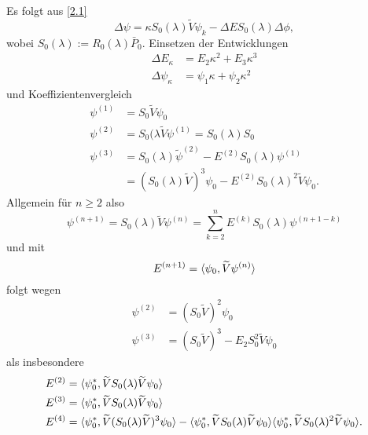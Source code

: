 \documentclass{mycourse}
\begin{document}
\begin{seg}
Es folgt aus \eqref{2.1}
\[
\Delta \psi = \kappa S_0(\lambda) \tilde V \psi_k - \Delta E S_0(\lambda) \Delta \phi,
\]
wobei $S_0(\lambda):=R_0(\lambda) \bar P_0$. Einsetzen der Entwicklungen 
\begin{align*}
\Delta E_\kappa &= E_2 \kappa^2 + E_3 \kappa^3 \\
\Delta \psi_\kappa &= \psi_1 \kappa + \psi_2 \kappa^2
\end{align*}
und Koeffizientenvergleich
\begin{align*}
\psi^{(1)} &= S_0 \tilde V \psi_0\\
\psi^{(2)} &= S_0(\lambda \tilde V \psi^(1) =S_0(\lambda) S_0 \\
\psi^{(3)} &= S_0(\lambda) \tilde \psi^{(2)} - E^{(2)} S_0(\lambda) \psi^{(1)}\\
&=  (S_0(\lambda) \tilde V)^3 \psi_0 - E^{(2)} S_0(\lambda)^2 \tilde V \psi_0.
\end{align*}
Allgemein für $n\ge 2$ also
\[
\psi^{(n+1)}= S_0(\lambda) \tilde V \psi^{(n)} = \sum_{k=2}^n E^{(k)} S_0(\lambda) \psi^{(n+1-k)}
\]
und mit 
\[
E^{(n+1)}= \langle \psi_0, \widetilde V \psi^{(n)}\rangle
\] 
folgt wegen
\begin{align*}
\psi^{(2)} &= (S_0 \tilde V)^2 \psi_0\\
\psi^{(3)} &= (S_0 \tilde V)^3 - E_2 S_0^2 \tilde V \psi_0
\end{align*}
als insbesondere
\begin{align*}
E^{(2)} &=  \langle \psi_0^*, \widetilde V S_0(\lambda) \widetilde V \psi_0\rangle\\
E^{(3)} &= \langle \psi_0^*, \widetilde V S_0(\lambda) \widetilde V \psi_0\rangle \\
E^{(4)} &= \langle \psi_0^*, \widetilde V (S_0(\lambda) \widetilde V)^3 \psi_0\rangle - \langle \psi_0^*, \widetilde V S_0(\lambda) \widetilde V \psi_0\rangle \langle \psi_0^*, \widetilde V S_0(\lambda)^2 \widetilde V \psi_0\rangle.
\end{align*}
\end{seg}
\end{document}
